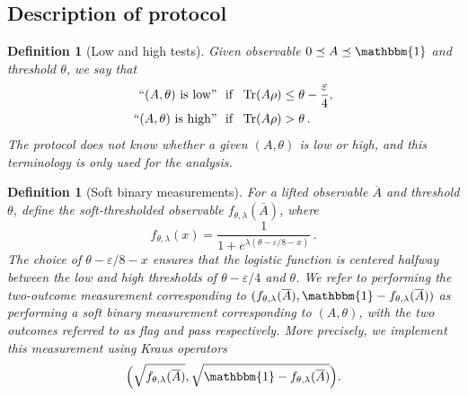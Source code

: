 \documentclass[10pt]{article}
\renewcommand{\epsilon}{\varepsilon}
\DeclareMathOperator{\Tr}{Tr}
\newcommand{\Id}{\mathbbm{1}}
\newtheorem{definition}[theorem]{Definition}
\newcommand{\angelos}[1]{{\color{blue}[angelos: #1]}}
\renewcommand{\angelos}[1]{}
\newcommand{\lift}[1]{\overline{#1}}
\newcommand{\gap}{\zeta}
\begin{document}

\subsection{Description of protocol}
\label{sec:protocol}


\begin{definition}[Low and high tests]
    Given observable $0\preceq A\preceq \Id$ and threshold $\theta$, we say that
    \begin{align}
        ``(A, \theta) \ \mathrm{is \ low}" \ & \ \text{if} \ \ \Tr(A\rho) \le \theta - \frac{\epsilon}{4}, \\
        ``(A, \theta) \ \mathrm{is \ high}" \ & \ \text{if} \ \ \Tr(A\rho) > \theta\,.
    \end{align}
    The protocol does not know whether a given $(A,\theta)$ is low or high, and this terminology is only used for the analysis.
\end{definition}

\begin{definition}[Soft binary measurements]
    For a lifted observable $\lift{A}$ and threshold $\theta$, define the \emph{soft-thresholded observable} $f_{\theta,\lambda}(\lift{A})$, where
    \begin{equation}
        f_{\theta, \lambda}(x) = \frac{1}{1 + e^{\lambda(\theta - \epsilon/8 - x)}}\,.
    \end{equation}
    The choice of $\theta - \epsilon/8 - x$ ensures that the logistic function is centered halfway between the low and high thresholds of $\theta - \epsilon/4$ and $\theta$. We refer to performing the two-outcome measurement corresponding to $(f_{\theta,\lambda}(\lift{A}), \Id - f_{\theta,\lambda}(\lift{A}))$ as performing a \emph{soft binary measurement} corresponding to $(A,\theta)$, with the two outcomes referred to as \emph{flag} and \emph{pass} respectively. More precisely, we implement this measurement using Kraus operators
    \begin{equation*}
        \Big(\sqrt{f_{\theta,\lambda}(\lift{A})}, \sqrt{\Id - f_{\theta,\lambda}(\lift{A})}\Big).
    \end{equation*}
\end{definition}
\end{document}
